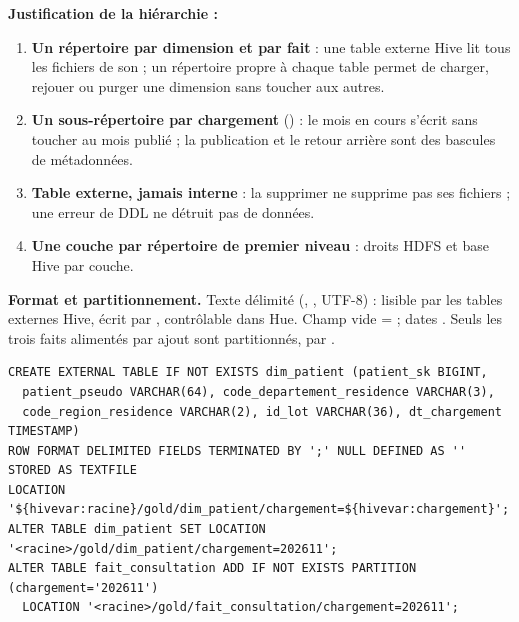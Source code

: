 \textbf{Justification de la hiérarchie :}
\begin{enumerate}[nosep,leftmargin=*]
\item \textbf{Un répertoire par dimension et par fait} : une table externe Hive lit tous les fichiers de son  ; un répertoire propre à chaque table permet de charger, rejouer ou purger une dimension sans toucher aux autres.
\item \textbf{Un sous-répertoire par chargement} () : le mois en cours s'écrit sans toucher au mois publié ; la publication et le retour arrière sont des bascules de métadonnées.
\item \textbf{Table externe, jamais interne} : la supprimer ne supprime pas ses fichiers ; une erreur de DDL ne détruit pas de données.
\item \textbf{Une couche par répertoire de premier niveau} : droits HDFS et base Hive par couche.
\end{enumerate}

\textbf{Format et partitionnement.} Texte délimité (, \code{;}, UTF-8) : lisible par les tables externes Hive, écrit par , contrôlable dans Hue. Champ vide =  ; dates . Seuls les trois faits alimentés par ajout sont partitionnés, par .

\begin{lstlisting}[style=sql,float=!htbp,label=lst:ddl,caption={Extrait du DDL HiveQL généré et publication d'un chargement}]
CREATE EXTERNAL TABLE IF NOT EXISTS dim_patient (patient_sk BIGINT,
  patient_pseudo VARCHAR(64), code_departement_residence VARCHAR(3),
  code_region_residence VARCHAR(2), id_lot VARCHAR(36), dt_chargement TIMESTAMP)
ROW FORMAT DELIMITED FIELDS TERMINATED BY ';' NULL DEFINED AS '' STORED AS TEXTFILE
LOCATION '${hivevar:racine}/gold/dim_patient/chargement=${hivevar:chargement}';
ALTER TABLE dim_patient SET LOCATION '<racine>/gold/dim_patient/chargement=202611';
ALTER TABLE fait_consultation ADD IF NOT EXISTS PARTITION (chargement='202611')
  LOCATION '<racine>/gold/fait_consultation/chargement=202611';
\end{lstlisting}

